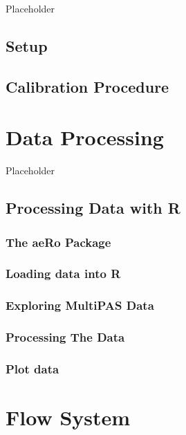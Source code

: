 \documentclass[]{book}
\begin{document}
Placeholder

\section{Setup}\label{setup}

\section{Calibration Procedure}\label{calibration-procedure}

\chapter{Data Processing}\label{data-processing}

Placeholder

\section{Processing Data with R}\label{processing-data-with-r}

\subsection{The aeRo Package}\label{the-aero-package}

\subsection{Loading data into R}\label{loading-data-into-r}

\subsection{Exploring MultiPAS Data}\label{exploring-multipas-data}

\subsection{Processing The Data}\label{processing-the-data}

\subsection{Plot data}\label{plot-data}

\chapter{Flow System}\label{flow-system}
\end{document}
